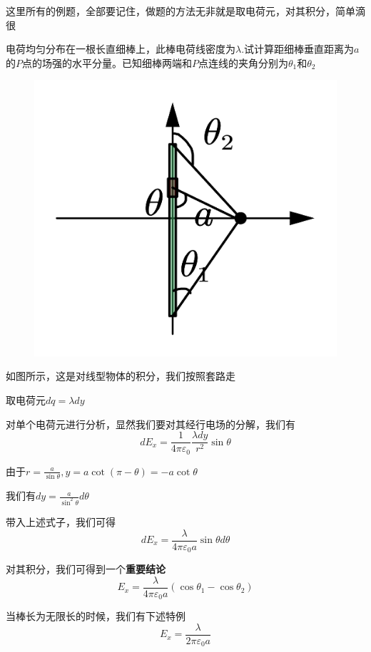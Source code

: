 \documentclass[lang=cn,10pt]{elegantbook}
\begin{document}
		这里所有的例题，全部要记住，做题的方法无非就是取电荷元，对其积分，简单滴很
		\begin{example}
			电荷均匀分布在一根长直细棒上，此棒电荷线密度为$\lambda$.试计算距细棒垂直距离为$a$的$P$点的场强的水平分量。已知细棒两端和$P$点连线的夹角分别为$\theta_{1}$和$\theta _{2}$
		\end{example}
		\begin{solution}
\begin{figure}[H]
	\centering
	\includegraphics[width=0.3\linewidth]{image/线条}
	\caption{}
	\label{fig:}
\end{figure}
			
			如图所示，这是对线型物体的积分，我们按照套路走
			
			取电荷元$dq=\lambda dy$
			
			对单个电荷元进行分析，显然我们要对其经行电场的分解，我们有
			\begin{equation*}
				dE_x=\frac{1}{4\pi \varepsilon _0}\frac{\lambda dy}{r^2}\sin \theta 
			\end{equation*}
			
			由于$r=\frac{a}{\sin\theta},y=a\cot(\pi-\theta)=-a\cot\theta$
			
			我们有$dy=\frac{a}{\sin ^2\theta}d\theta$
			
			带入上述式子，我们可得
			\begin{equation*}
				dE_x=\frac{\lambda}{4\pi \varepsilon _0a}\sin \theta d\theta
			\end{equation*}
			
			对其积分，我们可得到一个\textbf{重要结论}
			\begin{equation*}
				E_x=\frac{\lambda}{4\pi \varepsilon _0a}\left( \cos \theta _1-\cos \theta _2 \right) 
			\end{equation*}
		\end{solution}
		\begin{note}
			当棒长为无限长的时候，我们有下述特例
			\begin{equation*}
				E_x=\frac{\lambda}{2\pi \varepsilon _0a}
			\end{equation*}
		\end{note}
\end{document}
